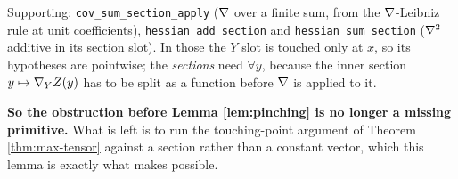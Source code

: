 \begin{lemma}
  Supporting: \texttt{cov\_sum\_section\_apply} ($\nabla$ over a finite sum, from the
  $\nabla$-Leibniz rule at unit coefficients), \texttt{hessian\_add\_section} and
  \texttt{hessian\_sum\_section} ($\nabla^2$ additive in its section slot). In those the $Y$ slot
  is touched only at $x$, so its hypotheses are pointwise; the \emph{sections} need $\forall y$,
  because the inner section $y \mapsto \nabla_Y Z(y)$ has to be split as a function before
  $\nabla$ is applied to it.

  \textbf{So the obstruction before Lemma \ref{lem:pinching} is no longer a missing primitive.}
  What is left is to run the touching-point argument of Theorem \ref{thm:max-tensor} against a
  section rather than a constant vector, which this lemma is exactly what makes possible.
\end{lemma}

